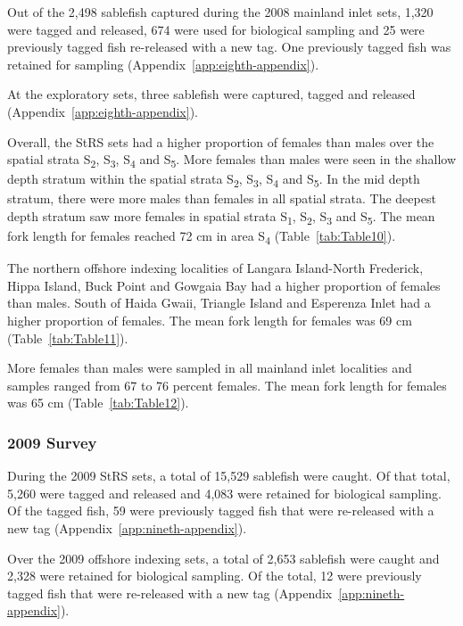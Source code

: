 \documentclass[12pt]{article}\usepackage[]{graphicx}\usepackage[]{color}
\begin{document}
Out of the 2,498 sablefish captured during the 2008 mainland inlet sets, 1,320 were tagged and released, 674 were used for biological sampling and 25 were previously tagged fish re-released with a new tag. One previously tagged fish was retained for sampling (Appendix~\ref{app:eighth-appendix}).

At the exploratory sets, three sablefish were captured, tagged and released (Appendix~\ref{app:eighth-appendix}).

Overall, the StRS sets had a higher proportion of females than males over the spatial strata S\textsubscript{2}, S\textsubscript{3}, S\textsubscript{4} and S\textsubscript{5}. More females than males were seen in the shallow depth stratum within the spatial strata S\textsubscript{2}, S\textsubscript{3}, S\textsubscript{4} and S\textsubscript{5}. In the mid depth stratum, there were more males than females in all spatial strata. The deepest depth stratum saw more females in spatial strata S\textsubscript{1}, S\textsubscript{2}, S\textsubscript{3} and S\textsubscript{5}. The mean fork length for females reached 72 cm in area S\textsubscript{4} (Table~\ref{tab:Table10}).

The northern offshore indexing localities of Langara Island-North Frederick, Hippa Island, Buck Point and Gowgaia Bay had a higher proportion of females than males. South of Haida Gwaii, Triangle Island and Esperenza Inlet had a higher proportion of females. The mean fork length for females was 69 cm (Table~\ref{tab:Table11}).

More females than males were sampled in all mainland inlet localities and samples ranged from 67 to 76 percent females. The mean fork length for females was 65 cm (Table~\ref{tab:Table12}).

\hypertarget{survey-3}{%
\subsubsection{2009 Survey}\label{survey-3}}

During the 2009 StRS sets, a total of 15,529 sablefish were caught. Of that total, 5,260 were tagged and released and 4,083 were retained for biological sampling. Of the tagged fish, 59 were previously tagged fish that were re-released with a new tag (Appendix~\ref{app:nineth-appendix}).

Over the 2009 offshore indexing sets, a total of 2,653 sablefish were caught and 2,328 were retained for biological sampling. Of the total, 12 were previously tagged fish that were re-released with a new tag (Appendix~\ref{app:nineth-appendix}).
\end{document}
